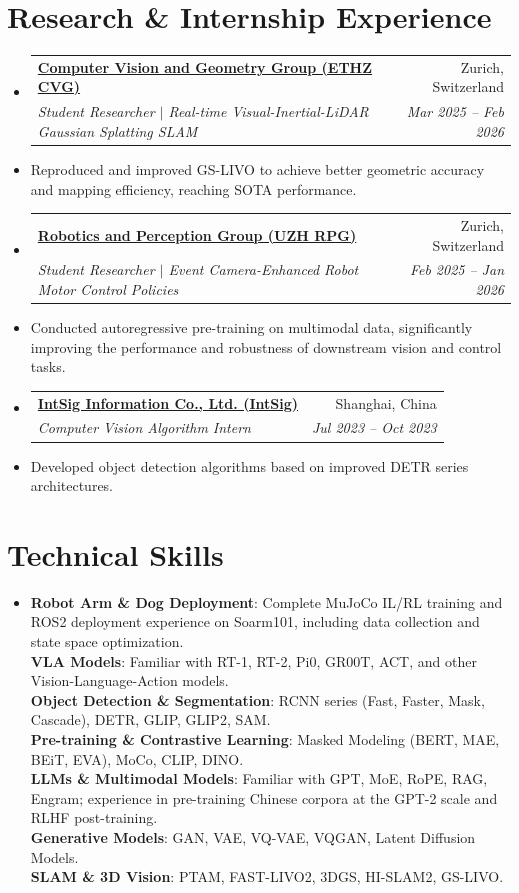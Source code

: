 \documentclass[a4paper,10pt]{article}
\makeatletter
\newcommand{\resumeSubheading}[4]{
  \vspace{-1pt}\item
    \begin{tabular*}{\textwidth}[t]{@{}l@{\extracolsep{\fill}}r@{}}
      \textbf{#1} & #2 \\
      \textit{\small#3} & \textit{\small #4} \\
    \end{tabular*}\vspace{-1pt} 
}
\makeatother
\begin{document}
\section{Research \& Internship Experience}
  \begin{itemize}[leftmargin=0.15in, label={}]
    
    \resumeSubheading
      {\href{https://cvg.ethz.ch/}{Computer Vision and Geometry Group (ETHZ CVG)}}{Zurich, Switzerland}
      {Student Researcher $|$ Real-time Visual-Inertial-LiDAR Gaussian Splatting SLAM}{Mar 2025 -- Feb 2026}
      \item \small{Reproduced and improved GS-LIVO to achieve better geometric accuracy and mapping efficiency, reaching SOTA performance.}

    \resumeSubheading
      {\href{https://rpg.ifi.uzh.ch/}{Robotics and Perception Group (UZH RPG)}}{Zurich, Switzerland}
      {Student Researcher $|$ Event Camera-Enhanced Robot Motor Control Policies}{Feb 2025 -- Jan 2026}
      \item \small{Conducted autoregressive pre-training on multimodal data, significantly improving the performance and robustness of downstream vision and control tasks.}

    \resumeSubheading
      {\href{https://www.intsig.com/en/}{IntSig Information Co., Ltd. (IntSig)}}{Shanghai, China}
      {Computer Vision Algorithm Intern}{Jul 2023 -- Oct 2023}
      \item \small{Developed object detection algorithms based on improved DETR series architectures.}

  \end{itemize}


\section{Technical Skills}
 \begin{itemize}[leftmargin=0.15in, label={}]
    \item \small{
     \textbf{Robot Arm \& Dog Deployment}: Complete MuJoCo IL/RL training and ROS2 deployment experience on Soarm101, including data collection and state space optimization. \\
     \textbf{VLA Models}: Familiar with RT-1, RT-2, Pi0, GR00T, ACT, and other Vision-Language-Action models. \\
     \textbf{Object Detection \& Segmentation}: RCNN series (Fast, Faster, Mask, Cascade), DETR, GLIP, GLIP2, SAM. \\
     \textbf{Pre-training \& Contrastive Learning}: Masked Modeling (BERT, MAE, BEiT, EVA), MoCo, CLIP, DINO. \\
     \textbf{LLMs \& Multimodal Models}: Familiar with GPT, MoE, RoPE, RAG, Engram; experience in pre-training Chinese corpora at the GPT-2 scale and RLHF post-training. \\
     \textbf{Generative Models}: GAN, VAE, VQ-VAE, VQGAN, Latent Diffusion Models. \\
     \textbf{SLAM \& 3D Vision}: PTAM, FAST-LIVO2, 3DGS, HI-SLAM2, GS-LIVO. \\
    }
 \end{itemize}
\end{document}
